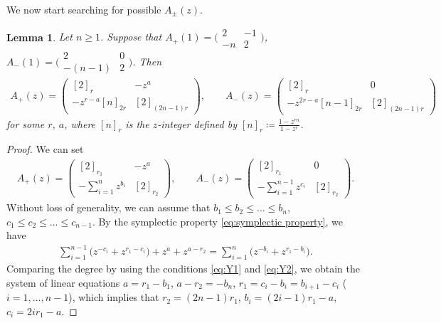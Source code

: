 \documentclass[pdftex]{sigma}
\numberwithin{equation}{section}
\newtheorem{Lemma}[Theorem]{Lemma}
\theoremstyle{definition}
\begin{document}
We now start searching for possible $A_\pm(z)$.

\begin{Lemma}\label{lemma:Apm(z) 1 2 3}
 Let $n \geq 1$.
 Suppose that
$
 A_{+}(1) =
 \bigl( \begin{smallmatrix}
 2 & - 1 \\
 - n & 2
\end{smallmatrix}\bigr)$, $
 A_{-}(1) =
 \bigl( \begin{smallmatrix}
 2 & 0 \\
 - (n-1) & 2
 \end{smallmatrix}\bigr)$.
 Then
 \begin{align*}
 A_{+}(z) =
 \begin{pmatrix}
 [2]_r & - z^{a} \\
 - z^{r-a} [n]_{2r} & [2]_{(2n-1)r}
 \end{pmatrix},\qquad
 A_{-}(z) =
 \begin{pmatrix}
 [2]_r & 0 \\
 - z^{2r-a} [n-1]_{2r} & [2]_{(2n-1)r}
 \end{pmatrix}
 \end{align*}
 for some $r$, $a$, where $[n]_r$ is the \emph{$z$-integer} defined by
$
 [n]_r \coloneqq \frac{1 - z^{rn}}{1 - z^r}$.
\end{Lemma}
\begin{proof}
 We can set
 \begin{align*}
 A_{+}(z) =
 \begin{pmatrix}
 [2]_{r_1} & - z^a \\
 - \sum\limits_{i=1}^n z^{b_i} & [2]_{r_2}
 \end{pmatrix},\qquad
 A_{-}(z) =
 \begin{pmatrix}
 [2]_{r_1} & 0 \\
 - \sum\limits_{i=1}^{n-1} z^{c_i} & [2]_{r_2}
 \end{pmatrix}.
 \end{align*}
 Without loss of generality, we can assume that
$b_1 \leq b_2 \leq \dots \leq b_n$, $
 c_1 \leq c_2 \leq \dots \leq c_{n-1}$.
 By the symplectic property \eqref{eq:symplectic property}, we have
 \begin{align*}
 \sum_{i=1}^{n-1}\bigl(z^{-c_i} + z^{r_1 - c_i}\bigr) + z^{a} + z^{a-r_2} =
 \sum_{i=1}^{n} \bigl(z^{-b_i} + z^{r_1 - b_i}\bigr).
 \end{align*}
 Comparing the degree by using the conditions \eqref{eq:Y1} and \eqref{eq:Y2}, we obtain the
 system of linear equations
$
 a = r_1 - b_1$, $ a-r_2 = -b_n$, $
 r_1 = c_i - b_i = b_{i+1} - c_i $ ($i=1,\dots,n-1$),
 which implies that
$
 r_2 = (2n-1) r_1$, $
 b_i = (2i - 1) r_1 - a$, $
 c_i = 2i r_1 - a$.
\end{proof}
\end{document}
